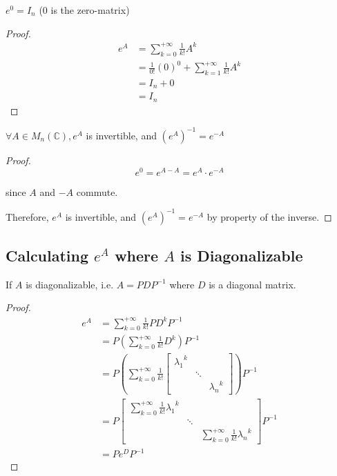 \begin{theorem}
	$e^0 = I_n$ (0 is the zero-matrix)
\end{theorem}

\begin{proof}
	\begin{align}
		e^A &=\sum_{k=0}^{+\infty} \frac{1}{k!} A^k\\
		&=\frac{1}{0!} (0)^0 + \sum_{k=1}^{+\infty} \frac{1}{k!} A^k\\
		&= I_n + 0\\
		&= I_n
	\end{align}
\end{proof}

\begin{theorem}
	$\forall A \in M_n(\mathbb{C}), e^A$ is invertible, and $\left(e^A\right)^{-1} = e^{-A}$
\end{theorem}

\begin{proof}
	\[e^0 = e^{A - A} = e^A \cdot e^{-A}\]

	since $A$ and $-A$ commute.

	Therefore, $e^A$ is invertible, and $\left(e^A\right)^{-1} = e^{-A}$ by property of the inverse.
\end{proof}

\subsection{Calculating $e^A$ where $A$ is Diagonalizable}

If $A$ is diagonalizable, i.e. $A = PDP^{-1}$ where $D$ is a diagonal matrix.

\begin{proof}
	\begin{align}
		e^A &=\sum_{k=0}^{+\infty} \frac{1}{k!} PD^kP^{-1}\\
		&= P \left(\sum_{k=0}^{+\infty} \frac{1}{k!} D^k\right) P^{-1}\\
		&= P \left(\sum_{k=0}^{+\infty} \frac{1}{k!} \begin{bmatrix}
			{\lambda_1}^k&&\\
			&\ddots&\\
			&&{\lambda_n}^k
		\end{bmatrix}\right) P^{-1}\\
		&= P \begin{bmatrix}
			\sum_{k=0}^{+\infty} \frac{1}{k!} {\lambda_1}^k&&\\
			&\ddots&\\
			&&\sum_{k=0}^{+\infty} \frac{1}{k!} {\lambda_n}^k
		\end{bmatrix} P^{-1}\\
		&= P e^D P^{-1}
	\end{align}
\end{proof}

